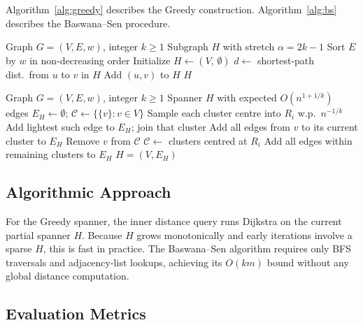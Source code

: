 \documentclass[11pt,a4paper,twocolumn]{article}
\begin{document}
Algorithm~\ref{alg:greedy} describes the Greedy construction.
Algorithm~\ref{alg:bs} describes the Baswana--Sen procedure.

\begin{algorithm}[t]
\caption{Greedy $(2k{-}1)$-Spanner}
\label{alg:greedy}
\begin{algorithmic}[1]
\Require Graph $G=(V,E,w)$, integer $k \geq 1$
\Ensure Subgraph $H$ with stretch $\alpha = 2k-1$
\State Sort $E$ by $w$ in non-decreasing order
\State Initialize $H \leftarrow (V,\,\emptyset)$
  \State $d \leftarrow$ shortest-path dist.\ from $u$ to $v$ in $H$
    \State Add $(u,v)$ to $H$
  \EndIf
\EndFor
\State \Return $H$
\end{algorithmic}
\end{algorithm}

\begin{algorithm}[t]
\caption{Baswana--Sen $(2k{-}1)$-Spanner}
\label{alg:bs}
\begin{algorithmic}[1]
\Require Graph $G=(V,E,w)$, integer $k \geq 1$
\Ensure Spanner $H$ with expected $O(n^{1+1/k})$ edges
\State $E_H \leftarrow \emptyset$;\;
       $\mathcal{C} \leftarrow \{\{v\} : v \in V\}$
  \State Sample each cluster centre into $R_i$ w.p.\ $n^{-1/k}$
      \State Add lightest such edge to $E_H$; join that cluster
    \Else
      \State Add all edges from $v$ to its current cluster to $E_H$
      \State Remove $v$ from $\mathcal{C}$
    \EndIf
  \EndFor
  \State $\mathcal{C} \leftarrow$ clusters centred at $R_i$
\EndFor
\State Add all edges within remaining clusters to $E_H$
\State \Return $H = (V, E_H)$
\end{algorithmic}
\end{algorithm}

\subsection{Algorithmic Approach}

For the Greedy spanner, the inner distance query runs Dijkstra
on the current partial spanner $H$.
Because $H$ grows monotonically and early iterations involve a
sparse $H$, this is fast in practice.
The Baswana--Sen algorithm requires only BFS traversals and
adjacency-list lookups, achieving its $O(km)$ bound without any
global distance computation.

\subsection{Evaluation Metrics}
\end{document}
